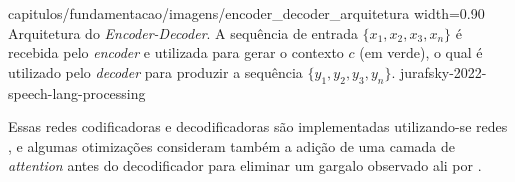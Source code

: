 {capitulos/fundamentacao/imagens/encoder_decoder_arquitetura}
{width=0.90\textwidth}
{Arquitetura do \textit{Encoder-Decoder}. A sequência de entrada \(\{x_1, x_2, x_3, x_n\}\) é recebida pelo \textit{encoder} e utilizada para gerar o contexto \(c\) (em verde), o qual é utilizado pelo \textit{decoder} para produzir a sequência \(\{y_1, y_2, y_3, y_n\}\).}
{jurafsky-2022-speech-lang-processing}


Essas redes codificadoras e decodificadoras são implementadas utilizando-se redes , e algumas otimizações consideram também a adição de uma camada de \textit{attention} antes do decodificador para eliminar um gargalo observado ali por .








